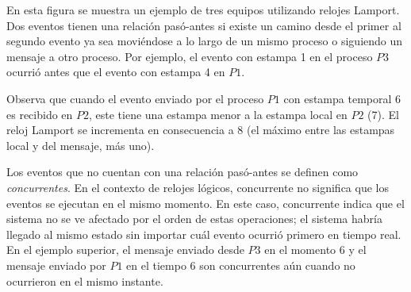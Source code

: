 \documentclass[12pt]{article}
\begin{document}
En esta figura se muestra un ejemplo de tres equipos utilizando relojes Lamport.
Dos eventos tienen una relación pasó-antes si existe un camino desde el primer al segundo evento ya sea moviéndose a lo largo de un mismo proceso o siguiendo un mensaje a otro proceso.
Por ejemplo, el evento con estampa 1 en el proceso $P3$ ocurrió antes que el evento con estampa 4 en $P1$.

Observa que cuando el evento enviado por el proceso $P1$ con estampa temporal 6 es recibido en $P2$,
este tiene una estampa menor a la estampa local en $P2$ (7).
El reloj Lamport se incrementa en consecuencia a 8 (el máximo entre las estampas local y del mensaje, más uno).

Los eventos que no cuentan con una relación pasó-antes se definen como \emph{concurrentes}.
En el contexto de relojes lógicos,
concurrente no significa que los eventos se ejecutan en el mismo momento.
En este caso, concurrente indica que el sistema no se ve afectado por el orden de estas operaciones;
el sistema habría llegado al mismo estado sin importar cuál evento ocurrió primero en tiempo real.
En el ejemplo superior, el mensaje enviado desde $P3$ en el momento 6 y el mensaje enviado por $P1$ en el tiempo 6 son concurrentes aún cuando no ocurrieron en el mismo instante.
\end{document}
